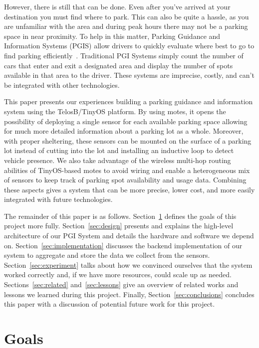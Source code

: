 \documentclass{acm_proc}
\begin{document}
However, there is still that can be done.
Even after you've arrived at your destination you must find where to park.
This can also be quite a hassle, as you are unfamiliar with the area and
during peak hours there may not be a parking space in near proximity.
To help in this matter, Parking Guidance and Information Systems (PGIS)
allow drivers to quickly evaluate where best to go to find parking
efficiently~\cite{sakai:pgi-toyota}.
Traditional PGI Systems simply count the number of cars that enter and exit
a designated area and display the number of spots available in that area to
the driver.
These systems are imprecise, costly, and can't be integrated with other
technologies.

This paper presents our experiences building a parking guidance and
information system using the TelosB/TinyOS platform.
By using motes, it opens the possibility of deploying a single sensor for
each available parking space allowing for much more detailed information
about a parking lot as a whole.
Moreover, with proper sheltering, these sensors can be mounted on the
surface of a parking lot instead of cutting into the lot and installing an
inductive loop to detect vehicle presence.
We also take advantage of the wireless multi-hop routing abilities of
TinyOS-based motes to avoid wiring and enable a heterogeneous mix of
sensors to keep track of parking spot availability and usage data.
Combining these aspects gives a system that can be more precise, lower
cost, and more easily integrated with future technologies.

The remainder of this paper is as follows.
Section~\ref{sec:goals} defines the goals of this project more fully.
Section~\ref{sec:design} presents and explains the high-level architecture
of our PGI System and details the hardware and software we depend on.
Section~\ref{sec:implementation} discusses the backend implementation of
our system to aggregate and store the data we collect from the sensors.
Section~\ref{sec:experiment} talks about how we convinced ourselves that
the system worked correctly and, if we have more resources, could scale up
as needed.
Sections~\ref{sec:related} and~\ref{sec:lessons} give an overview of
related works and lessons we learned during this project.
Finally, Section~\ref{sec:conclusions} concludes this paper with a
discussion of potential future work for this project.

\section{Goals}\label{sec:goals}
\end{document}
